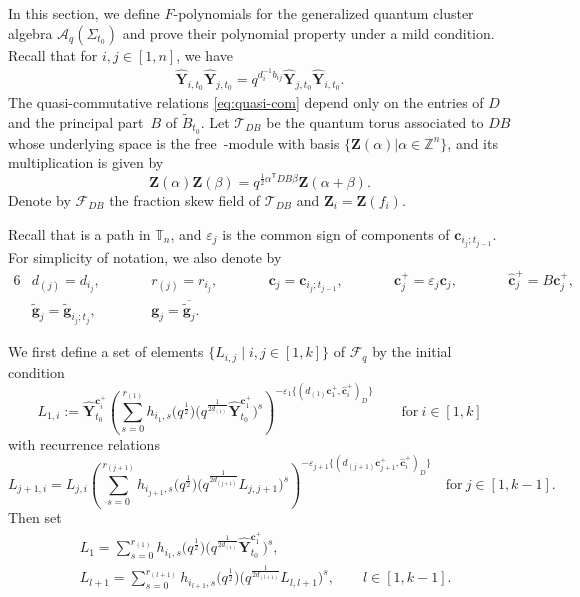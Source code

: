 \documentclass[pdftex]{sigma}
\numberwithin{equation}{section}
\begin{document}
 In this section, we define $F$-polynomials for the generalized quantum cluster algebra $\mathcal{A}_q(\Sigma_{t_0})$ and prove their polynomial property under a mild condition.
Recall that for $i,j\in[1,n]$, we have
\begin{align}\label{eq:quasi-com}
\mathbf{\hat{Y}}_{i,t_{0}}\mathbf{\hat{Y}}_{j,t_{0}}=q^{d_{i}^{-1}b_{ij}}\mathbf{\hat{Y}}_{j,t_{0}}\mathbf{\hat{Y}}_{i,t_{0}}.
\end{align}
The quasi-commutative relations \eqref{eq:quasi-com} depend only on the entries of $D$ and the principal part~$B$ of $\tilde{B}_{t_0}$.
Let $\mathcal{T}_{DB}$ be the quantum torus associated to $DB$ whose underlying space is the free~-module with basis $\{\mathbf{Z}(\alpha)| \alpha\in\mathbb{Z}^{n}\}$, and its multiplication is given by
\[\mathbf{Z}(\alpha)\mathbf{Z}(\beta)=q^{\frac{1}{2}\alpha^{\mathsf T}DB\beta}\mathbf{Z}(\alpha+\beta).\]
Denote by $\mathcal{F}_{DB}$ the fraction skew field of $\mathcal{T}_{DB}$ and $\mathbf{Z}_{i}=\mathbf{Z}(f_{i})$.

Recall that  is a path in $\mathbb{T}_n$, and $\varepsilon_{j}$ is the common sign of components of $\mathbf{c}_{i_j;t_{j-1}}$. For simplicity of notation, we also denote by
\begin{alignat*}{6}
& d_{(j)}=d_{i_j},\qquad&&
r_{(j)}=r_{i_j},  \qquad &&  \mathbf{c}_{j}=\mathbf{c}_{i_j;t_{j-1}},\qquad&&    \mathbf{c}_{j}^+=\varepsilon_{j}\mathbf{c}_{j}, \qquad&&   \mathbf{\hat{c}}_{j}^+=B\mathbf{c}_{j}^+,& \\
& \mathbf{\tilde{g}}_{j}=\mathbf{\tilde{g}}_{i_j;t_j}, \qquad&&   \mathbf{g}_{j}=\overline{\mathbf{\tilde{g}}_{j}}.&&&&&&&
\end{alignat*}

We first define a set of elements $\{ L_{i,j}\mid i,j\in [1,k]\}$ of $\mathcal{F}_q$ by the initial condition
\[L_{1,i}:=\mathbf{\hat{Y}}_{t_{0}}^{\mathbf{c}_{i}^{+}}\left(\sum\limits^{r_{(1)}}_{s=0}h_{i_{1},s}
\bigl(q^{\frac{1}{2}}\bigr)\bigl(q^{\frac{1}{2d_{(1)}}}\mathbf{\hat{Y}}_{t_0}^{\mathbf{c}_{1}^{+}}\bigr)^{s}\right)^{-\varepsilon_{1}\{(d_{(1)}\mathbf{c}_{1}^{+},\mathbf{\hat{c}}_{i}^{+})_{D}\}} \qquad \text{for}\  i\in [1,k]
\]
with recurrence relations
\[
 L_{j+1,i}=L_{j,i}\left(\sum\limits^{r_{(j+1)}}_{s=0}h_{i_{j+1},s}\bigl(q^{\frac{1}{2}}\bigr)
 \bigl(q^{\frac{1}{2d_{(j+1)}}}L_{j,j+1}\bigr)^{s} \right)^{-\varepsilon_{j+1}\{(d_{(j+1)}\mathbf{c}_{j+1}^{+},\mathbf{\hat{c}}_{i}^{+})_{D}\}} \quad \text{for}\  j \in [1,k-1].
\]
Then set
\begin{align*}
 &L_1=\sum\limits^{r_{(1)}}_{s=0}h_{i_{1},s}\bigl(q^{\frac{1}{2}}\bigr)\bigl(q^{\frac{1}{2d_{(1)}}}\mathbf{\hat{Y}}_{t_{0}}^{\mathbf{c}_{1}^{+}}\bigr)^{s},\\
 &L_{l+1}=\sum\limits_{s=0}^{r_{(l+1)}}h_{i_{l+1},s}\bigl(q^{\frac{1}{2}}\bigr)\bigl(q^{\frac{1}{2d_{(l+1)}}}L_{l,l+1}\bigr)^{s},\qquad l\in[1,k-1].
 \end{align*}
\end{document}

